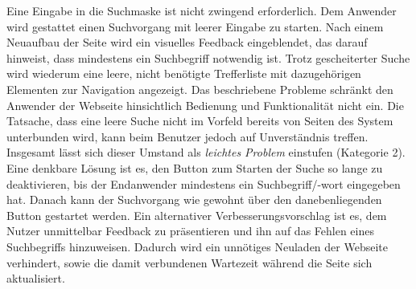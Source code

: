 {
	Eine Eingabe in die Suchmaske ist nicht zwingend erforderlich. Dem Anwender wird gestattet einen Suchvorgang mit leerer Eingabe zu starten. Nach einem Neuaufbau der Seite wird ein visuelles Feedback eingeblendet, das darauf hinweist, dass mindestens ein Suchbegriff notwendig ist. Trotz gescheiterter Suche wird wiederum eine leere, nicht benötigte Trefferliste mit dazugehörigen Elementen zur Navigation angezeigt.
}
{
	Das beschriebene Probleme schränkt den Anwender der Webseite hinsichtlich Bedienung und Funktionalität nicht ein. Die Tatsache, dass eine leere Suche nicht im Vorfeld bereits von Seiten des System unterbunden wird, kann beim Benutzer jedoch auf Unverständnis treffen. Insgesamt lässt sich dieser Umstand als \emph{leichtes Problem} einstufen (Kategorie 2).
}
{
	Eine denkbare Lösung ist es, den Button zum Starten der Suche so lange zu deaktivieren, bis der Endanwender mindestens ein Suchbegriff/-wort eingegeben hat. Danach kann der Suchvorgang wie gewohnt über den danebenliegenden Button gestartet werden. Ein alternativer Verbesserungsvorschlag ist es, dem Nutzer unmittelbar Feedback zu präsentieren und ihn auf das Fehlen eines Suchbegriffs hinzuweisen. Dadurch wird ein unnötiges Neuladen der Webseite verhindert, sowie die damit verbundenen Wartezeit während die Seite sich aktualisiert.
}


